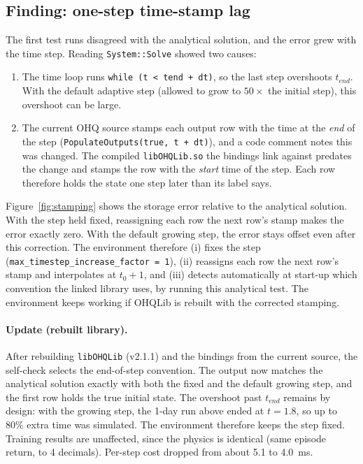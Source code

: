\documentclass[11pt]{article}
\newcommand{\code}[1]{\texttt{#1}}
\begin{document}
\subsection{Finding: one-step time-stamp lag}
The first test runs disagreed with the analytical solution, and the error
grew with the time step. Reading \code{System::Solve} showed two causes:
\begin{enumerate}
\item The time loop runs \code{while (t < tend + dt)}, so the last step
overshoots $t_{end}$. With the default adaptive step (allowed to grow to
$50\times$ the initial step), this overshoot can be large.
\item The current OHQ source stamps each output row with the time at the
\emph{end} of the step (\code{PopulateOutputs(true, t + dt)}), and a code
comment notes this was changed. The compiled \code{libOHQLib.so} the
bindings link against predates the change and stamps the row with the
\emph{start} time of the step. Each row therefore holds the state one step
later than its label says.
\end{enumerate}

Figure~\ref{fig:stamping} shows the storage error relative to the
analytical solution. With the step held fixed, reassigning each row the
next row's stamp makes the error exactly zero. With the default growing
step, the error stays offset even after this correction. The environment
therefore (i) fixes the step (\code{max\_timestep\_increase\_factor = 1}),
(ii) reassigns each row the next row's stamp and interpolates at
$t_0+1$, and (iii) detects automatically at start-up which convention the
linked library uses, by running this analytical test. The environment
keeps working if OHQLib is rebuilt with the corrected stamping.

\paragraph{Update (rebuilt library).} After rebuilding \code{libOHQLib}
(v2.1.1) and the bindings from the current source, the self-check selects
the end-of-step convention. The output now matches the analytical solution
exactly with both the fixed and the default growing step, and the first
row holds the true initial state. The overshoot past $t_{end}$ remains by
design: with the growing step, the 1-day run above ended at $t=1.8$, so up
to 80\% extra time was simulated. The environment therefore keeps the
step fixed. Training results are unaffected, since the physics is
identical (same episode return, to 4 decimals). Per-step cost dropped from
about 5.1 to 4.0~ms.
\end{document}
